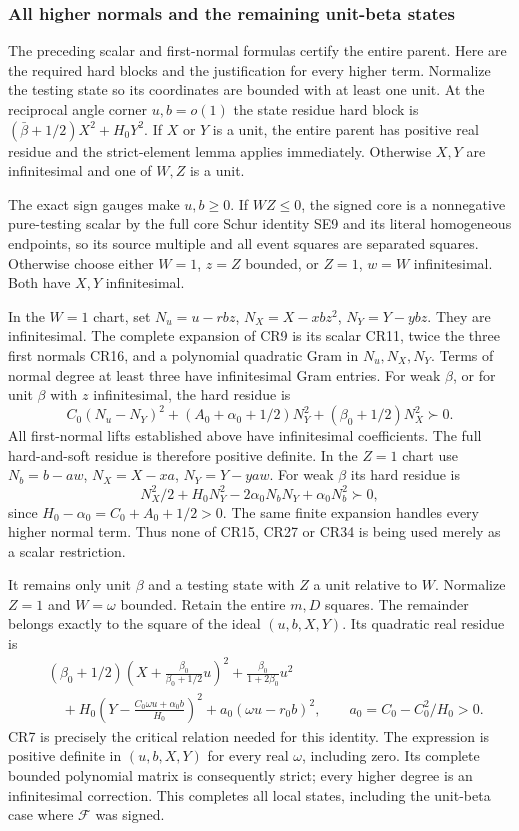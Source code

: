 \subsubsection*{All higher normals and the remaining unit-beta states}

The preceding scalar and first-normal formulas certify the entire
parent. Here are the required hard blocks and the justification for
every higher term. Normalize the testing state so its coordinates
are bounded with at least one unit. At the reciprocal angle corner
$u,b=o(1)$ the state residue hard block is
$(\bar\beta+1/2)X^2+H_0Y^2$. If $X$ or $Y$ is a unit, the
entire parent has positive real residue and the strict-element lemma
applies immediately. Otherwise $X,Y$ are infinitesimal and one of
$W,Z$ is a unit.

The exact sign gauges make $u,b\geq0$. If $WZ\leq0$, the signed
core is a nonnegative pure-testing scalar by the full core Schur
identity SE9 and its literal homogeneous endpoints, so its source
multiple and all event squares are separated squares. Otherwise
choose either $W=1$, $z=Z$ bounded, or $Z=1$, $w=W$
infinitesimal. Both have $X,Y$ infinitesimal.

In the $W=1$ chart, set
$N_u=u-rbz$, $N_X=X-xbz^2$, $N_Y=Y-ybz$.
They are infinitesimal. The complete expansion of CR9 is its scalar
CR11, twice the three first normals CR16, and a polynomial quadratic
Gram in $N_u,N_X,N_Y$. Terms of normal degree at least three
have infinitesimal Gram entries. For weak $\beta$, or for unit
$\beta$ with $z$ infinitesimal, the hard residue is
\[
 C_0(N_u-N_Y)^2+(A_0+\alpha_0+1/2)N_Y^2
                         +(\beta_0+1/2)N_X^2\succ0.
 \tag{CR37}
\]
All first-normal lifts established above have infinitesimal
coefficients. The full hard-and-soft residue is therefore positive
definite. In the $Z=1$ chart use
$N_b=b-aw$, $N_X=X-xa$, $N_Y=Y-yaw$.
For weak $\beta$ its hard residue is
\[
 N_X^2/2+H_0N_Y^2-2\alpha_0N_bN_Y+\alpha_0N_b^2\succ0,
 \tag{CR38}
\]
since $H_0-\alpha_0=C_0+A_0+1/2>0$.
The same finite expansion handles every higher normal term. Thus
none of CR15, CR27 or CR34 is being used merely as a scalar
restriction.

It remains only unit $\beta$ and a testing state with $Z$ a unit
relative to $W$. Normalize $Z=1$ and $W=\omega$ bounded. Retain
the entire $m,D$ squares. The remainder belongs exactly to the
square of the ideal $(u,b,X,Y)$. Its quadratic real residue is
\[
\begin{aligned}
 &(\beta_0+1/2)\left(X+\frac{\beta_0}{\beta_0+1/2}u\right)^2
      +\frac{\beta_0}{1+2\beta_0}u^2\\
 &\quad+H_0\left(Y-\frac{C_0\omega u+\alpha_0 b}{H_0}\right)^2
      +a_0(\omega u-r_0b)^2,
 \qquad a_0=C_0-C_0^2/H_0>0.
\end{aligned}\tag{CR39}
\]
CR7 is precisely the critical relation needed for this identity.
The expression is positive definite in $(u,b,X,Y)$ for every
real $\omega$, including zero. Its complete bounded polynomial
matrix is consequently strict; every higher degree is an
infinitesimal correction. This completes all local states, including
the unit-beta case where $\mathcal F$ was signed.

